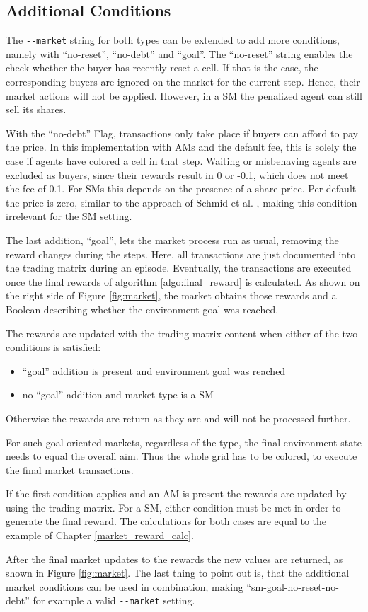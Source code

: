 \subsection{Additional Conditions}\label{market_conditions}
The \verb|--market| string for both types can be extended to add more conditions, namely with ``no-reset'', ``no-debt'' and ``goal''. The ``no-reset'' string enables the check whether the buyer has recently reset a cell. If that is the case, the corresponding buyers are ignored on the market for the current step. Hence, their market actions will not be applied. However, in a SM the penalized agent can still sell its shares. 

With the ``no-debt'' Flag, transactions only take place if buyers can afford to pay the price. In this implementation with AMs and the default fee, this is solely the case if agents have colored a cell in that step. Waiting or misbehaving agents are excluded as buyers, since their rewards result in 0 or -0.1, which does not meet the fee of 0.1. For SMs this depends on the presence of a share price. Per default the price is zero, similar to the approach of Schmid et al. \cite{scbe21}, making this condition irrelevant for the SM setting.

The last addition, ``goal'', lets the market process run as usual, removing the reward changes during the steps. Here, all transactions are just documented into the trading matrix during an episode. Eventually, the transactions are executed once the final rewards of algorithm \ref{algo:final_reward} is calculated. As shown on the right side of Figure \ref{fig:market}, the market obtains those rewards and a Boolean describing whether the environment goal was reached.

The rewards are updated with the trading matrix content when either of the two conditions is satisfied:
\begin{itemize}
    \item ``goal'' addition is present and environment goal was reached
    \item no ``goal'' addition and market type is a SM
\end{itemize}
Otherwise the rewards are return as they are and will not be processed further. 

For such goal oriented markets, regardless of the type, the final environment state needs to equal the overall aim. Thus the whole grid has to be colored, to execute the final market transactions.

If the first condition applies and an AM is present the rewards are updated by using the trading matrix. For a SM, either condition must be met in order to generate the final reward. The calculations for both cases are equal to the example of Chapter \ref{market_reward_calc}.

After the final market updates to the rewards the new values are returned, as shown in Figure \ref{fig:market}. The last thing to point out is, that the additional market conditions can be used in combination, making ``sm-goal-no-reset-no-debt'' for example a valid \verb|--market| setting.